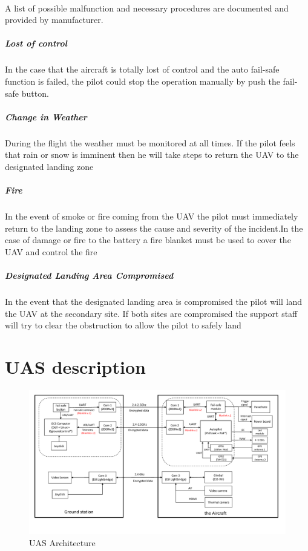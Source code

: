 \documentclass[]{article}
\begin{document}
	\paragraph{} A list of possible malfunction and necessary procedures are documented and provided by manufacturer.  
	\subparagraph{Lost of control}
	\paragraph{} In the case that the aircraft is totally lost of control and the auto fail-safe function is failed, the pilot could stop the operation manually by push the fail-safe button.
	\subparagraph{Change in Weather}
	\paragraph{} During the flight the weather must be monitored at all times. If the pilot feels that rain or snow is imminent then he will take steps to return the UAV to the designated landing zone
	\subparagraph{Fire}
	\paragraph{} In the event of smoke or fire coming from the UAV the pilot must immediately return to the landing zone to assess the cause and severity of the incident.In the case of damage or fire to the battery a fire blanket must be used to cover the UAV and control the fire
	\subparagraph{Designated Landing Area Compromised }
	\paragraph{}In the event that the designated landing area is compromised the pilot will land the UAV at the secondary site. If both sites are compromised the support staff will try to clear the obstruction to allow the pilot to safely land
\section{UAS description}

\begin{figure}[!ht]
	\centering
	\includegraphics[width=0.9\linewidth]{drone_1.pdf}
	\caption{UAS Architecture}
\end{figure} 
\end{document}
